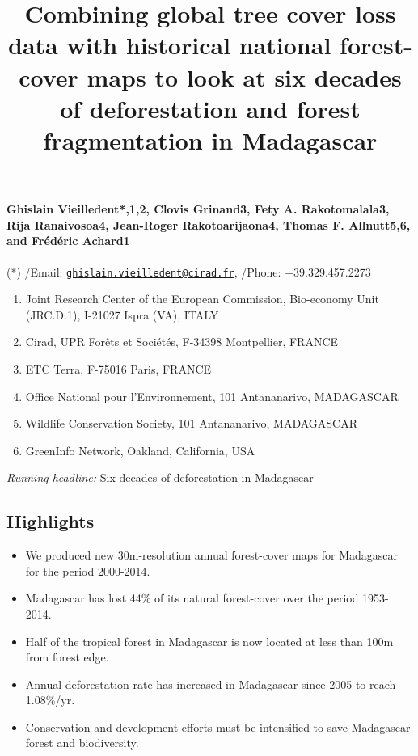 \documentclass[]{article}
\title{Combining global tree cover loss data with historical national
forest-cover maps to look at six decades of deforestation and forest
fragmentation in Madagascar}
\author{}
\date{}
\providecommand{\tightlist}{%
  \setlength{\itemsep}{0pt}\setlength{\parskip}{0pt}}
\let\oldparagraph\paragraph
\renewcommand{\paragraph}[1]{\oldparagraph{#1}\mbox{}}
\begin{document}
\maketitle

\hypertarget{ghislain-vieilledent12-clovis-grinand3-fety-a.-rakotomalala3-rija-ranaivosoa4-jean-roger-rakotoarijaona4-thomas-f.-allnutt56-and-frederic-achard1}{%
\paragraph{Ghislain Vieilledent*,1,2, Clovis Grinand3, Fety A.
Rakotomalala3, Rija Ranaivosoa4, Jean-Roger Rakotoarijaona4, Thomas F.
Allnutt5,6, and Frédéric
Achard1}\label{ghislain-vieilledent12-clovis-grinand3-fety-a.-rakotomalala3-rija-ranaivosoa4-jean-roger-rakotoarijaona4-thomas-f.-allnutt56-and-frederic-achard1}}

(*) /Email:
\href{mailto:ghislain.vieilledent@cirad.fr}{\nolinkurl{ghislain.vieilledent@cirad.fr}},
/Phone: +39.329.457.2273

\begin{enumerate}
\def\labelenumi{\arabic{enumi}.}
\tightlist
\item
  Joint Research Center of the European Commission, Bio-economy Unit
  (JRC.D.1), I-21027 Ispra (VA), ITALY
\item
  Cirad, UPR Forêts et Sociétés, F-34398 Montpellier, FRANCE
\item
  ETC Terra, F-75016 Paris, FRANCE
\item
  Office National pour l'Environnement, 101 Antananarivo, MADAGASCAR
\item
  Wildlife Conservation Society, 101 Antananarivo, MADAGASCAR
\item
  GreenInfo Network, Oakland, California, USA
\end{enumerate}

\emph{Running headline:} Six decades of deforestation in Madagascar

\hypertarget{highlights}{%
\subsection{Highlights}\label{highlights}}

\begin{itemize}
\tightlist
\item
  We produced new 30m-resolution annual forest-cover maps for Madagascar
  for the period 2000-2014.
\item
  Madagascar has lost 44\% of its natural forest-cover over the period
  1953-2014.
\item
  Half of the tropical forest in Madagascar is now located at less than
  100m from forest edge.
\item
  Annual deforestation rate has increased in Madagascar since 2005 to
  reach 1.08\%/yr.
\item
  Conservation and development efforts must be intensified to save
  Madagascar forest and biodiversity.
\end{itemize}
\end{document}
